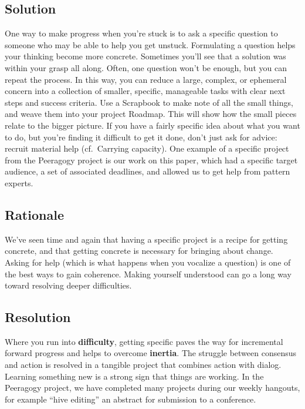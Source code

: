 \hypertarget{solution}{%
\subsection{Solution}\label{solution}}

One way to make progress when you're stuck is to ask a specific question
to someone who may be able to help you get unstuck. Formulating a
question helps your thinking become more concrete. Sometimes you'll see
that a solution was within your grasp all along. Often, one question
won't be enough, but you can repeat the process. In this way, you can
reduce a large, complex, or ephemeral concern into a collection of
smaller, specific, manageable tasks with clear next steps and success
criteria. Use a {{Scrapbook}} to make note of all the small things, and
weave them into your project {{Roadmap}}. This will show how the small
pieces relate to the bigger picture. If you have a fairly specific idea
about what you want to do, but you're finding it difficult to get it
done, don't just ask for advice: recruit material help (cf.~{{Carrying
capacity}}). One example of a specific project from the Peeragogy
project is our work on this paper, which had a specific target audience,
a set of associated deadlines, and allowed us to get help from pattern
experts.

\hypertarget{rationale}{%
\subsection{Rationale}\label{rationale}}

We've seen time and again that having a specific project is a recipe for
getting concrete, and that getting concrete is necessary for bringing
about change. Asking for help (which is what happens when you vocalize a
question) is one of the best ways to gain coherence. Making yourself
understood can go a long way toward resolving deeper difficulties.

\hypertarget{resolution}{%
\subsection{Resolution}\label{resolution}}

Where you run into \textbf{difficulty}, getting specific paves the way
for incremental forward progress and helps to overcome \textbf{inertia}.
The struggle between consensus and action is resolved in a tangible
project that combines action with dialog. Learning something new is a
strong sign that things are working. In the Peeragogy project, we have
completed many projects during our weekly hangouts, for example ``hive
editing'' an abstract for submission to a conference.

